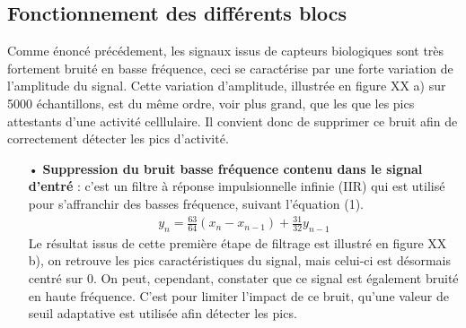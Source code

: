 \documentclass[a4paper,12pt]{article}
\begin{document}
\subsection{Fonctionnement des différents blocs}
Comme énoncé précédement, les signaux issus de capteurs biologiques sont très fortement bruité en basse fréquence, ceci se caractérise par une forte variation de l'amplitude du signal. Cette variation d'amplitude, illustrée en figure XX a) sur 5000 échantillons, est du même ordre, voir plus grand, que les que les pics attestants d'une activité celllulaire. Il convient donc de supprimer ce bruit afin de correctement détecter les pics d'activité.\\
\begin{itemize}
\item[•] \textbf{Suppression du bruit basse fréquence contenu dans le signal d'entré} : c'est un filtre à réponse impulsionnelle infinie (IIR) qui est utilisé pour s'affranchir des basses fréquence, suivant l'équation (1).
\begin{eqnarray}
y_n = \frac{63}{64}\left(x_n - x_{n-1}\right) + \frac{31}{32}y_{n-1}
\end{eqnarray}
Le résultat issus de cette première étape de filtrage est illustré en figure XX b), on retrouve les pics caractéristiques du signal, mais celui-ci est désormais centré sur 0. On peut, cependant, constater que ce signal est également bruité en haute fréquence. C'est pour limiter l'impact de ce bruit, qu'une valeur de seuil adaptative est utilisée afin détecter les pics.\\


\end{itemize}
\end{document}
